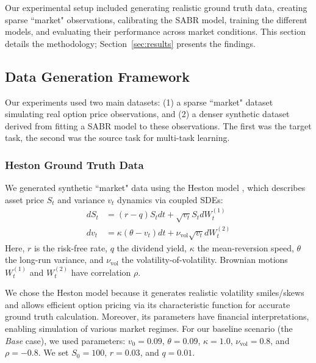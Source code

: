 \documentclass[preprint,12pt]{elsarticle}
\begin{document}
Our experimental setup included generating realistic ground truth data, creating sparse ``market" observations, calibrating the SABR model, training the different models, and evaluating their performance across market conditions. This section details the methodology; Section~\ref{sec:results} presents the findings.

\subsection{Data Generation Framework}

Our experiments used two main datasets: (1) a sparse ``market" dataset simulating real option price observations, and (2) a denser synthetic dataset derived from fitting a SABR model to these observations. The first was the target task, the second was the source task for multi-task learning.

\subsubsection{Heston Ground Truth Data}

We generated synthetic ``market" data using the Heston model \citep{heston1993closed}, which describes asset price $S_t$ and variance $v_t$ dynamics via coupled SDEs:
\begin{align}
dS_t &= (r-q)S_t dt + \sqrt{v_t} S_t dW_t^{(1)} \label{eq:heston_S}\\
dv_t &= \kappa(\theta - v_t)dt + \nu_{\text{vol}} \sqrt{v_t} dW_t^{(2)} \label{eq:heston_v}
\end{align}
Here, $r$ is the risk-free rate, $q$ the dividend yield, $\kappa$ the mean-reversion speed, $\theta$ the long-run variance, and $\nu_{\text{vol}}$ the volatility-of-volatility. Brownian motions $W_t^{(1)}$ and $W_t^{(2)}$ have correlation $\rho$.

We chose the Heston model because it generates realistic volatility smiles/skews and allows efficient option pricing via its characteristic function for accurate ground truth calculation. Moreover, its parameters have financial interpretations, enabling simulation of various market regimes. For our baseline scenario (the \textit{Base} case), we used parameters: $v_0 = 0.09$, $\theta = 0.09$, $\kappa = 1.0$, $\nu_{\text{vol}} = 0.8$, and $\rho = -0.8$. We set $S_0 = 100$, $r = 0.03$, and $q = 0.01$. 
\end{document}
